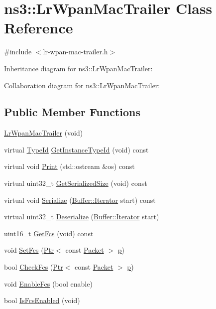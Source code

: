 \hypertarget{classns3_1_1LrWpanMacTrailer}{}\section{ns3\+:\+:Lr\+Wpan\+Mac\+Trailer Class Reference}
\label{classns3_1_1LrWpanMacTrailer}


{\ttfamily \#include $<$lr-\/wpan-\/mac-\/trailer.\+h$>$}



Inheritance diagram for ns3\+:\+:Lr\+Wpan\+Mac\+Trailer\+:


Collaboration diagram for ns3\+:\+:Lr\+Wpan\+Mac\+Trailer\+:
\subsection*{Public Member Functions}
\begin{DoxyCompactItemize}
\item 
\hyperlink{classns3_1_1LrWpanMacTrailer_a4fa7dec98bfc900322d2a4bcf0e60bfd}{Lr\+Wpan\+Mac\+Trailer} (void)
\item 
virtual \hyperlink{classns3_1_1TypeId}{Type\+Id} \hyperlink{classns3_1_1LrWpanMacTrailer_aebe29c343b7448236485e98331515950}{Get\+Instance\+Type\+Id} (void) const 
\item 
virtual void \hyperlink{classns3_1_1LrWpanMacTrailer_ac8db76dd0f6a6320bdf00f8ece2cc2b4}{Print} (std\+::ostream \&os) const 
\item 
virtual uint32\+\_\+t \hyperlink{classns3_1_1LrWpanMacTrailer_a9ce78ec97d5d9518a0d5a94a63ba7d78}{Get\+Serialized\+Size} (void) const 
\item 
virtual void \hyperlink{classns3_1_1LrWpanMacTrailer_a8a945270af865e4983035780d181c609}{Serialize} (\hyperlink{classns3_1_1Buffer_1_1Iterator}{Buffer\+::\+Iterator} start) const 
\item 
virtual uint32\+\_\+t \hyperlink{classns3_1_1LrWpanMacTrailer_a11423689ec3b96d897c1ebcfb7776bf3}{Deserialize} (\hyperlink{classns3_1_1Buffer_1_1Iterator}{Buffer\+::\+Iterator} start)
\item 
uint16\+\_\+t \hyperlink{classns3_1_1LrWpanMacTrailer_a040226de468b8c69c3924b79f20edcab}{Get\+Fcs} (void) const 
\item 
void \hyperlink{classns3_1_1LrWpanMacTrailer_aac760c67e24c886640dd552fa5b92d4e}{Set\+Fcs} (\hyperlink{classns3_1_1Ptr}{Ptr}$<$ const \hyperlink{classns3_1_1Packet}{Packet} $>$ \hyperlink{lte__link__budget__x2__handover__measures_8m_ac9de518908a968428863f829398a4e62}{p})
\item 
bool \hyperlink{classns3_1_1LrWpanMacTrailer_ad0eff9b77569c8f6abce72a04b27794b}{Check\+Fcs} (\hyperlink{classns3_1_1Ptr}{Ptr}$<$ const \hyperlink{classns3_1_1Packet}{Packet} $>$ \hyperlink{lte__link__budget__x2__handover__measures_8m_ac9de518908a968428863f829398a4e62}{p})
\item 
void \hyperlink{classns3_1_1LrWpanMacTrailer_ade854ac8fcf338673c01c205b693ecfc}{Enable\+Fcs} (bool enable)
\item 
bool \hyperlink{classns3_1_1LrWpanMacTrailer_a04c3840be8d40a1ce37ac3d858b9ea6d}{Is\+Fcs\+Enabled} (void)
\end{DoxyCompactItemize}
